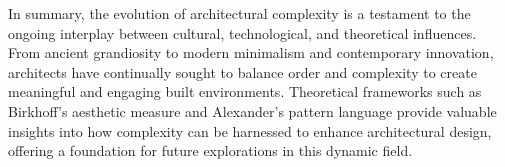 In summary, the evolution of architectural complexity is a testament to the ongoing interplay between cultural, technological, and theoretical influences. From ancient grandiosity to modern minimalism and contemporary innovation, architects have continually sought to balance order and complexity to create meaningful and engaging built environments. Theoretical frameworks such as Birkhoff's aesthetic measure and Alexander's pattern language provide valuable insights into how complexity can be harnessed to enhance architectural design, offering a foundation for future explorations in this dynamic field.


%
%
